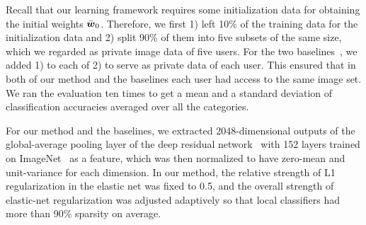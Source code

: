 \documentclass[10pt,twocolumn,letterpaper]{article}
\def\vct#1{\mbox{\boldmath $#1$}}
\begin{document}
Recall that our learning framework requires some initialization data for obtaining the initial weights $\bar{\vct{w}}_0$. Therefore, we first 1) left 10\% of the training data for the initialization data and 2) split 90\% of them into five subsets of the same size, which we regarded as private image data of five users. For the two baselines~\cite{Pathak2010a,Rajkumar2012a}, we added 1) to each of 2) to serve as private data of each user. This ensured that in both of our method and the baselines each user had access to the same image set. We ran the evaluation ten times to get a mean and a standard deviation of classification accuracies averaged over all the categories.

For our method and the baselines, we extracted 2048-dimensional outputs of the global-average pooling layer of the deep residual network~\cite{He2016a} with 152 layers trained on ImageNet~\cite{Russakovsky2015a} as a feature, which was then normalized to have zero-mean and unit-variance for each dimension. In our method, the relative strength of L1 regularization in the elastic net was fixed to 0.5, and the overall strength of elastic-net regularization was adjusted adaptively so that local classifiers had more than 90\% sparsity on average. 
\end{document}
